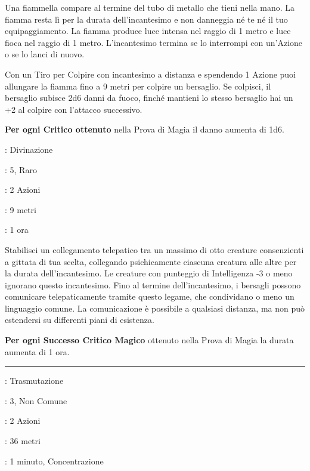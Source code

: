 \begin{multicols}{2}
Una fiammella compare al termine del tubo di metallo che tieni nella mano. La fiamma resta lì per la durata dell'incantesimo e non danneggia né te né il tuo equipaggiamento. La fiamma produce luce intensa nel raggio di 1 metro e luce fioca nel raggio di 1 metro. L'incantesimo termina se lo interrompi con un'Azione o se lo lanci di nuovo.

Con un Tiro per Colpire con incantesimo a distanza e spendendo 1 Azione puoi allungare la fiamma fino a 9 metri per colpire un bersaglio. Se colpisci, il bersaglio subisce 2d6 danni da fuoco, finché mantieni lo stesso bersaglio hai un +2 al colpire con l'attacco successivo.

\textbf{Per ogni Critico ottenuto} nella Prova di Magia il danno aumenta di 1d6.

\noindent\colorbox{OBSSgold!10}{
\begin{minipage}{0.95\linewidth}
\begin{description}[noitemsep, topsep=0pt, parsep=0pt, partopsep=0pt, leftmargin=0cm, labelwidth=1.3cm]
	\item[\textbf{Lista}]: Divinazione
	\item[\textbf{Livello}]: 5, Raro
	\item[\textbf{Lancio}]: 2 Azioni
	\item[\textbf{Gittata}]: 9 metri
	\item[\textbf{Durata}]: 1 ora
\end{description}
\end{minipage}}\smallskip

Stabilisci un collegamento telepatico tra un massimo di otto creature consenzienti a gittata di tua scelta, collegando psichicamente ciascuna creatura alle altre per la durata dell'incantesimo. Le creature con punteggio di Intelligenza -3 o meno ignorano questo incantesimo. Fino al termine dell'incantesimo, i bersagli possono comunicare telepaticamente tramite questo legame, che condividano o meno un linguaggio comune. La comunicazione è possibile a qualsiasi distanza, ma non può estendersi su differenti piani di esistenza.

\textbf{Per ogni Successo Critico Magico} ottenuto nella Prova di Magia la durata aumenta di 1 ora.

\smallskip\noindent\rule{\linewidth}{2pt} \hypertarget{Lentezza}{}\smallskip{}\hypertarget{lentezza}{}
\noindent
\begin{description}[noitemsep, topsep=0pt, parsep=0pt, partopsep=0pt, leftmargin=0cm, labelwidth=1.3cm]
	\item[\textbf{Lista}]: Trasmutazione
	\item[\textbf{Livello}]: 3, Non Comune
	\item[\textbf{Lancio}]: 2 Azioni
	\item[\textbf{Gittata}]: 36 metri
	\item[\textbf{Durata}]: 1 minuto, Concentrazione
\end{description}


\end{multicols}
